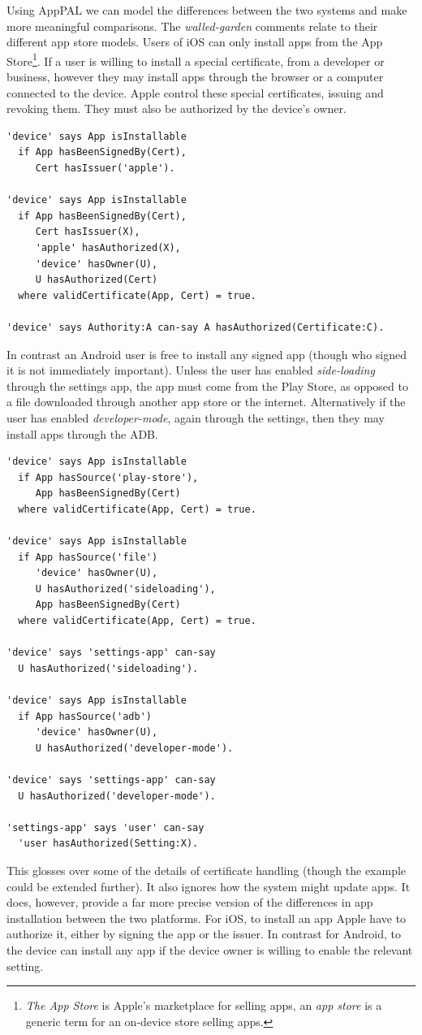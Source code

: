 \documentclass[thesis.tex]{subfiles}
\begin{document}
Using AppPAL we can model the differences between the two systems and make more meaningful comparisons.
The \emph{walled-garden} comments relate to their different app store models.
Users of iOS can only install apps from the App Store\footnote{\emph{The App Store} is Apple's marketplace for selling apps, an \emph{app store} is a generic term for an on-device store selling apps.}.
If a user is willing to install a special certificate, from a developer or business, however they may install apps through the browser or a computer connected to the device.
Apple control these special certificates, issuing and revoking them.
They must also be authorized by the device's owner.
\begin{lstlisting}
'device' says App isInstallable
  if App hasBeenSignedBy(Cert),
     Cert hasIssuer('apple').

'device' says App isInstallable
  if App hasBeenSignedBy(Cert),
     Cert hasIssuer(X),
     'apple' hasAuthorized(X),
     'device' hasOwner(U),
     U hasAuthorized(Cert)
  where validCertificate(App, Cert) = true.

'device' says Authority:A can-say A hasAuthorized(Certificate:C).
\end{lstlisting}
In contrast an Android user is free to install any signed app (though who signed it is not immediately important).
Unless the user has enabled \emph{side-loading} through the settings app, the app must come from the Play Store, as opposed to a file downloaded through another app store or the internet.
Alternatively if the user has enabled \emph{developer-mode}, again through the settings, then they may install apps through the \ac{ADB}.
\begin{lstlisting}
'device' says App isInstallable
  if App hasSource('play-store'),
     App hasBeenSignedBy(Cert)
  where validCertificate(App, Cert) = true.

'device' says App isInstallable
  if App hasSource('file')
     'device' hasOwner(U),
     U hasAuthorized('sideloading'),
     App hasBeenSignedBy(Cert)
  where validCertificate(App, Cert) = true.

'device' says 'settings-app' can-say
  U hasAuthorized('sideloading').

'device' says App isInstallable
  if App hasSource('adb')
     'device' hasOwner(U),
     U hasAuthorized('developer-mode').

'device' says 'settings-app' can-say
  U hasAuthorized('developer-mode').

'settings-app' says 'user' can-say
  'user hasAuthorized(Setting:X).
\end{lstlisting}
This glosses over some of the details of certificate handling (though the example could be extended further).
It also ignores how the system might update apps.
It does, however, provide a far more precise version of the differences in app installation between the two platforms.
For iOS, to install an app Apple have to authorize it, either by signing the app or the issuer.
In contrast for Android, to the device can install any app if the device owner is willing to enable the relevant setting.
\end{document}
